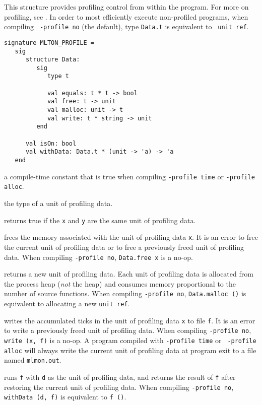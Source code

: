 
This structure provides profiling control from within the program.
For more on profiling, see .  In order to most
efficiently execute non-profiled programs, when compiling {\tt
-profile no} (the default), type {\tt Data.t} is equivalent to {\tt
unit ref}.

\begin{verbatim}
signature MLTON_PROFILE =
   sig
      structure Data:
         sig
            type t

            val equals: t * t -> bool
            val free: t -> unit
            val malloc: unit -> t
            val write: t * string -> unit
         end

      val isOn: bool
      val withData: Data.t * (unit -> 'a) -> 'a
   end
\end{verbatim}

\begin{description}

a compile-time constant that is true when compiling {\tt -profile
time} or {\tt -profile alloc}.

 the type of a unit of profiling data.

returns true if the {\tt x} and {\tt y} are the same unit of profiling
data.

frees the memory associated with the unit of profiling data {\tt x}.
It is an error to free the current unit of profiling data or to free a
previously freed unit of profiling data.  When compiling {\tt -profile
no}, {\tt Data.free x} is a no-op.

returns a new unit of profiling data.  Each unit of profiling data is
allocated from the process heap (\emph{not} the {\mlton} heap) and
consumes memory proportional to the number of source functions.  When
compiling {\tt -profile no}, {\tt Data.malloc ()} is equivalent to
allocating a new {\tt unit ref}.

writes the accumulated ticks in the unit of profiling data {\tt x} to
file {\tt f}.  It is an error to write a previously freed unit of
profiling data.  When compiling {\tt -profile no}, {\tt write (x, f)}
is a no-op.  A program compiled with {\tt -profile time} or {\tt
-profile alloc} will always write the current unit of profiling data
at program exit to a file named {\tt mlmon.out}.

runs {\tt f} with {\tt d} as the unit of profiling data, and returns
the result of {\tt f} after restoring the current unit of profiling
data.  When compiling {\tt -profile no}, {\tt withData (d, f)} is
equivalent to {\tt f ()}.

\end{description}
%
